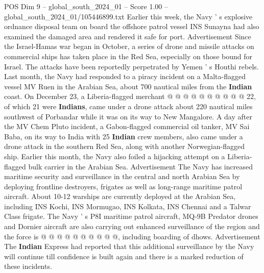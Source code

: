 \begin{textsample}{POS Dim 9 – global\_south\_2024\_01 – Score 1.00 – global\_south\_2024\_01/105446899.txt}
Earlier this week, the Navy ' s explosive ordnance disposal team on board the offshore patrol vessel INS Sunayna had also examined the damaged area and rendered it safe for port.
Advertisement Since the Israel-Hamas war began in October, a series of drone and missile attacks on commercial ships has taken place in the Red Sea, especially on those bound for Israel.
The attacks have been reportedly perpetrated by Yemen ' s Houthi rebels.
Last month, the Navy had responded to a piracy incident on a Malta-flagged vessel MV Ruen in the Arabian Sea, about 700 nautical miles from the \textbf{Indian} coast.
On December 23, a Liberia-flagged merchant @ @ @ @ @ @ @ @ @ @ 22, of which 21 were \textbf{Indians}, came under a drone attack about 220 nautical miles southwest of Porbandar while it was on its way to New Mangalore.
A day after the MV Chem Pluto incident, a Gabon-flagged commercial oil tanker, MV Sai Baba, on its way to India with 25 \textbf{Indian} crew members, also came under a drone attack in the southern Red Sea, along with another Norwegian-flagged ship.
Earlier this month, the Navy also foiled a hijacking attempt on a Liberia-flagged bulk carrier in the Arabian Sea.
Advertisement The Navy has increased maritime security and surveillance in the central and north Arabian Sea by deploying frontline destroyers, frigates as well as long-range maritime patrol aircraft.
About 10-12 warships are currently deployed at the Arabian Sea, including INS Kochi, INS Mormugao, INS Kolkata, INS Chennai and a Talwar Class frigate.
The Navy ' s P8I maritime patrol aircraft, MQ-9B Predator drones and Dornier aircraft are also carrying out enhanced surveillance of the region and the force is @ @ @ @ @ @ @ @ @ @, including boarding of dhows.
Advertisement The \textbf{Indian} Express had reported that this additional surveillance by the Navy will continue till confidence is built again and there is a marked reduction of these incidents.

\end{textsample}
